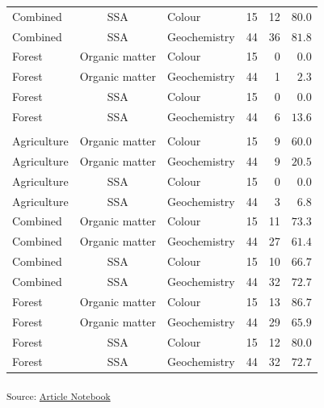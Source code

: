 \documentclass[
  number]{elsarticle}
\begin{document}
\begin{supptab}
{\begin{longtable*}{lclrrr}
Combined & SSA & Colour & 15 & 12 & $80.0$ \\ 
Combined & SSA & Geochemistry & 44 & 36 & $81.8$ \\ 
Forest & Organic matter & Colour & 15 & 0 & $0.0$ \\ 
Forest & Organic matter & Geochemistry & 44 & 1 & $2.3$ \\ 
Forest & SSA & Colour & 15 & 0 & $0.0$ \\ 
Forest & SSA & Geochemistry & 44 & 6 & $13.6$ \\ 
\midrule\addlinespace[2.5pt]
 \\ 
\midrule\addlinespace[2.5pt]
Agriculture & Organic matter & Colour & 15 & 9 & $60.0$ \\ 
Agriculture & Organic matter & Geochemistry & 44 & 9 & $20.5$ \\ 
Agriculture & SSA & Colour & 15 & 0 & $0.0$ \\ 
Agriculture & SSA & Geochemistry & 44 & 3 & $6.8$ \\ 
Combined & Organic matter & Colour & 15 & 11 & $73.3$ \\ 
Combined & Organic matter & Geochemistry & 44 & 27 & $61.4$ \\ 
Combined & SSA & Colour & 15 & 10 & $66.7$ \\ 
Combined & SSA & Geochemistry & 44 & 32 & $72.7$ \\ 
Forest & Organic matter & Colour & 15 & 13 & $86.7$ \\ 
Forest & Organic matter & Geochemistry & 44 & 29 & $65.9$ \\ 
Forest & SSA & Colour & 15 & 12 & $80.0$ \\ 
Forest & SSA & Geochemistry & 44 & 32 & $72.7$ \\ 
\bottomrule
\end{longtable*}

\textsubscript{Source:
\href{https://alex-koiter.github.io/sampling-design-manuscript/index.qmd.html}{Article
Notebook}}

}

\end{supptab}%
\end{document}
